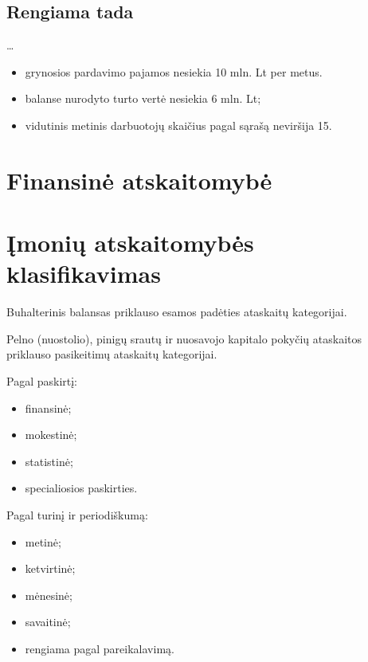 \subsection{Rengiama tada}


…
\begin{itemize}
  \item grynosios pardavimo pajamos nesiekia 10 mln. Lt per metus.
  \item balanse nurodyto turto vertė nesiekia 6 mln. Lt;
  \item vidutinis metinis darbuotojų skaičius pagal sąrašą
    neviršija 15.
\end{itemize}

\section{Finansinė atskaitomybė}


\section{Įmonių atskaitomybės klasifikavimas}


Buhalterinis balansas priklauso esamos padėties ataskaitų kategorijai.

Pelno (nuostolio), pinigų srautų ir nuosavojo kapitalo pokyčių ataskaitos
priklauso pasikeitimų ataskaitų kategorijai.



Pagal paskirtį:
\begin{itemize}
  \item finansinė;
  \item mokestinė;
  \item statistinė;
  \item specialiosios paskirties.
\end{itemize}


Pagal turinį ir periodiškumą:
\begin{itemize}
  \item metinė;
  \item ketvirtinė;
  \item mėnesinė;
  \item savaitinė;
  \item rengiama pagal pareikalavimą.
\end{itemize}

